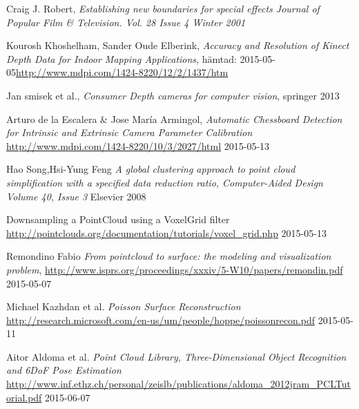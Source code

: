 \documentclass[a4paper,12pt,oneside,final]{extbook}
\begin{document}
\begin{thebibliography}{99}

 Craig J. Robert, \emph{Establishing new boundaries for special effects Journal of Popular Film \& Television. Vol. 28 Issue 4 Winter 2001 }

 Kourosh Khoshelham, Sander Oude Elberink, \emph{Accuracy and Resolution of Kinect Depth Data for Indoor Mapping Applications}, hämtad: 2015-05-05\newline \url{http://www.mdpi.com/1424-8220/12/2/1437/htm}

 Jan smisek et al., \emph{Consumer Depth cameras for computer vision}, springer 2013

 Arturo de la Escalera \& Jose María Armingol, \emph{Automatic Chessboard Detection for Intrinsic and Extrinsic Camera Parameter Calibration}  \\ \url{http://www.mdpi.com/1424-8220/10/3/2027/html} 2015-05-13

 Hao Song,Hsi-Yung Feng \emph{A global clustering approach to point cloud simplification with a specified data reduction ratio, Computer-Aided Design Volume 40, Issue 3} Elsevier 2008

 Downsampling a PointCloud using a VoxelGrid filter
\newline \url{http://pointclouds.org/documentation/tutorials/voxel_grid.php} 2015-05-13

 Remondino Fabio \emph{From pointcloud to surface: the modeling and visualization problem}, \url{http://www.isprs.org/proceedings/xxxiv/5-W10/papers/remondin.pdf} 2015-05-07

 Michael Kazhdan et al. \emph{Poisson Surface Reconstruction} \url{http://research.microsoft.com/en-us/um/people/hoppe/poissonrecon.pdf} 2015-05-11

 Aitor Aldoma et al. \emph{Point Cloud Library, Three-Dimensional Object Recognition and 6DoF Pose Estimation} \url{http://www.inf.ethz.ch/personal/zeislb/publications/aldoma_2012jram_PCLTutorial.pdf} 2015-06-07

\end{thebibliography}


\appendix

\newpage
\end{document}
